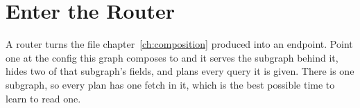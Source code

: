 \chapter{Enter the Router}
\label{ch:enter-the-router}

A router turns the file chapter~\ref{ch:composition} produced into an endpoint.
Point one at the config this graph composes to and it serves the subgraph
behind it, hides two of that subgraph's fields, and plans every query it is
given. There is one subgraph, so every plan has one fetch in it, which is the
best possible time to learn to read one.







